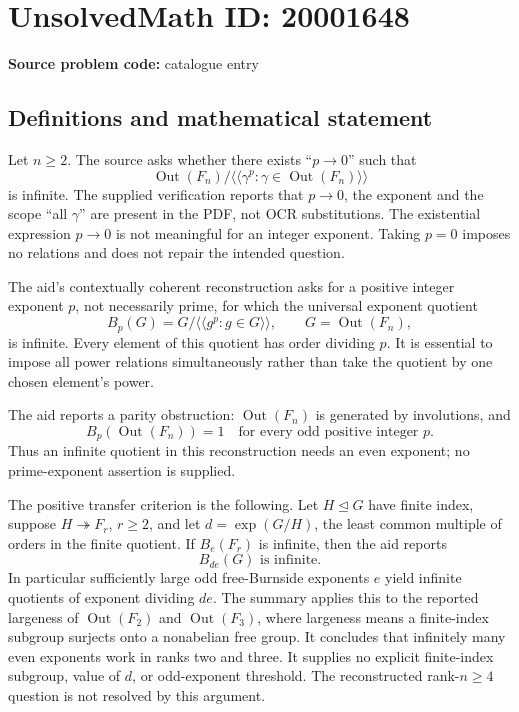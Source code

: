 \documentclass[11pt]{article}
\begin{document}
\section*{UnsolvedMath ID: 20001648}
\textbf{Source problem code:} catalogue entry
\subsection{Definitions and mathematical statement}
Let \(n\geq2\). The source asks whether there exists ``\(p\to0\)'' such that
\[
 \operatorname{Out}(F_n)/
 \langle\!\langle\gamma^p:\gamma\in\operatorname{Out}(F_n)\rangle\!\rangle
\]
is infinite. The supplied verification reports that \(p\to0\), the exponent and the scope ``all \(\gamma\)'' are present in the PDF, not OCR substitutions. The existential expression \(p\to0\) is not meaningful for an integer exponent. Taking \(p=0\) imposes no relations and does not repair the intended question.

The aid's contextually coherent reconstruction asks for a positive integer exponent \(p\), not necessarily prime, for which the universal exponent quotient
\[
 B_p(G)=G/\langle\!\langle g^p:g\in G\rangle\!\rangle,
 \qquad G=\operatorname{Out}(F_n),
\]
is infinite. Every element of this quotient has order dividing \(p\). It is essential to impose all power relations simultaneously rather than take the quotient by one chosen element's power.

The aid reports a parity obstruction: \(\operatorname{Out}(F_n)\) is generated by involutions, and
\[
 B_p(\operatorname{Out}(F_n))=1\quad\text{for every odd positive integer }p.
\]
Thus an infinite quotient in this reconstruction needs an even exponent; no prime-exponent assertion is supplied.

The positive transfer criterion is the following. Let \(H\trianglelefteq G\) have finite index, suppose \(H\twoheadrightarrow F_r\), \(r\geq2\), and let \(d=\exp(G/H)\), the least common multiple of orders in the finite quotient. If \(B_e(F_r)\) is infinite, then the aid reports
\[
 B_{de}(G)\text{ is infinite}.
\]
In particular sufficiently large odd free-Burnside exponents \(e\) yield infinite quotients of exponent dividing \(de\). The summary applies this to the reported largeness of \(\operatorname{Out}(F_2)\) and \(\operatorname{Out}(F_3)\), where largeness means a finite-index subgroup surjects onto a nonabelian free group. It concludes that infinitely many even exponents work in ranks two and three. It supplies no explicit finite-index subgroup, value of \(d\), or odd-exponent threshold. The reconstructed rank-\(n\geq4\) question is not resolved by this argument.
\end{document}
